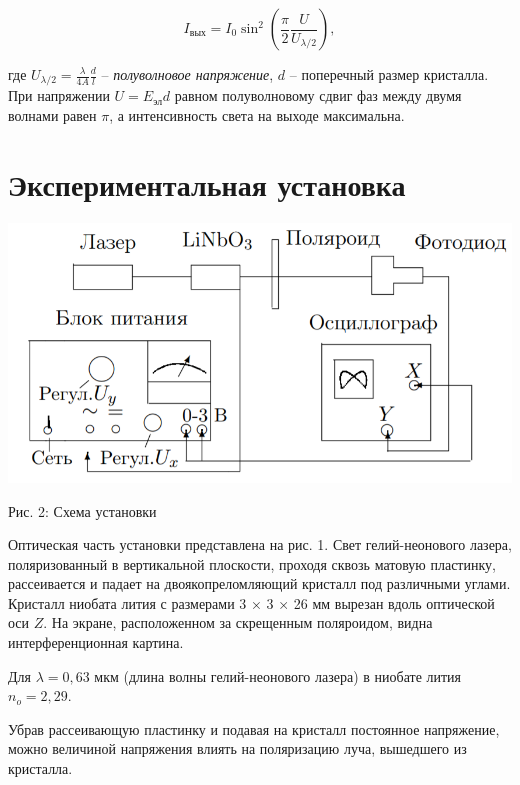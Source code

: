 \documentclass[a4paper,12pt]{article} %
\begin{document}
\begin{equation}
I_{\text{вых}} = I_0 \sin^2 \left(\dfrac{\pi}{2} \dfrac{U}{U_{\lambda/2}} \right),
\end{equation}

\noindent где $U_{\lambda/2} = \frac{\lambda}{4A}\frac{d}{l}$ -- \textit{полуволновое напряжение}, $d$ -- поперечный размер кристалла.  При напряжении $U = E_{\text{эл}}d$ равном полуволновому сдвиг фаз между двумя волнами равен $\pi$, а интенсивность света на выходе максимальна. 

\section{Экспериментальная установка}

\begin{center}

  \centering
  \includegraphics[scale={0.5}]{2.png}

{Рис. 2: Схема установки}

\end{center}

\noindent Оптическая часть установки
представлена на рис. 1. Свет гелий-неонового лазера, поляризованный в вертикальной плоскости, проходя сквозь матовую пластинку, рассеивается и падает на двоякопреломляющий кристалл
под различными углами. Кристалл ниобата лития с размерами
3 × 3 × 26 мм вырезан вдоль оптической оси $Z$. На экране, расположенном за скрещенным поляроидом, видна интерференционная
картина.

\medskip

\noindent Для $\lambda = 0,63 \text{ мкм}$ (длина волны гелий-неонового лазера) в ниобате лития $n_o = 2,29$.

\medskip

\noindent Убрав рассеивающую пластинку и подавая на кристалл постоянное напряжение, можно величиной напряжения влиять на поляризацию луча, вышедшего из кристалла.
\end{document}
